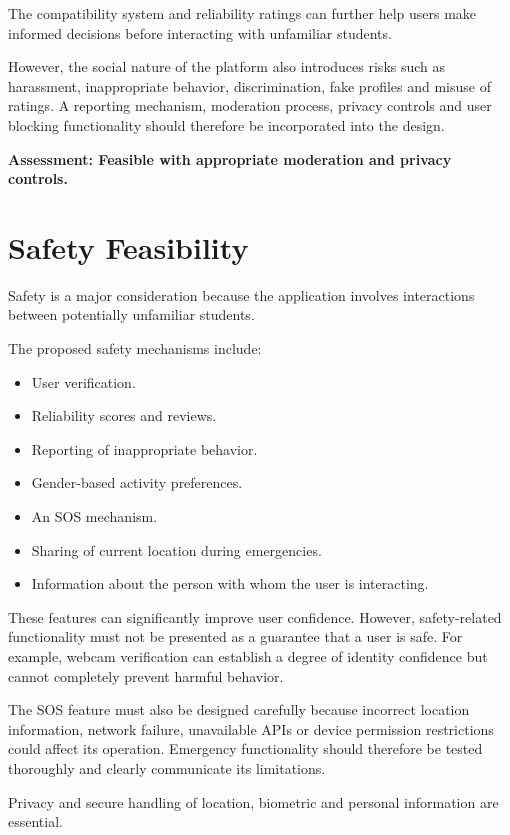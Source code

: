 \documentclass{tietreport}
\begin{document}
The compatibility system and reliability ratings can further help users make informed
decisions before interacting with unfamiliar students.

However, the social nature of the platform also introduces risks such as harassment,
inappropriate behavior, discrimination, fake profiles and misuse of ratings. A reporting
mechanism, moderation process, privacy controls and user blocking functionality should
therefore be incorporated into the design.

\noindent\textbf{Assessment: Feasible with appropriate moderation and privacy controls.}

\section{Safety Feasibility}

Safety is a major consideration because the application involves interactions between
potentially unfamiliar students.

The proposed safety mechanisms include:

\begin{itemize}[nosep]
  \item User verification.
  \item Reliability scores and reviews.
  \item Reporting of inappropriate behavior.
  \item Gender-based activity preferences.
  \item An SOS mechanism.
  \item Sharing of current location during emergencies.
  \item Information about the person with whom the user is interacting.
\end{itemize}

These features can significantly improve user confidence. However, safety-related
functionality must not be presented as a guarantee that a user is safe. For example,
webcam verification can establish a degree of identity confidence but cannot completely
prevent harmful behavior.

The SOS feature must also be designed carefully because incorrect location information,
network failure, unavailable APIs or device permission restrictions could affect its
operation. Emergency functionality should therefore be tested thoroughly and clearly
communicate its limitations.

Privacy and secure handling of location, biometric and personal information are
essential.
\end{document}
